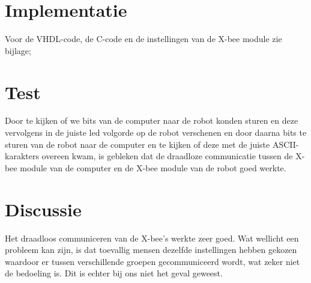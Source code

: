 \documentclass{report}
\begin{document}
\section{Implementatie}

Voor de VHDL-code, de C-code en de instellingen van de X-bee module zie bijlage;

\section{Test}

Door te kijken of we bits van de computer naar de robot konden sturen en deze vervolgens in de juiste led volgorde op de robot verschenen en door daarna bits te sturen van de robot naar de computer en te kijken of deze met de juiste ASCII-karakters overeen kwam, is gebleken dat de draadloze communicatie tussen de X-bee module van de computer en de X-bee module van de robot goed werkte.

\section{Discussie}

Het draadloos communiceren van de X-bee's werkte zeer goed. 
Wat wellicht een probleem kan zijn, is dat toevallig mensen dezelfde instellingen hebben gekozen waardoor er tussen verschillende groepen gecommuniceerd wordt, wat zeker niet de bedoeling is. Dit is echter bij ons niet het geval geweest.
\end{document}
